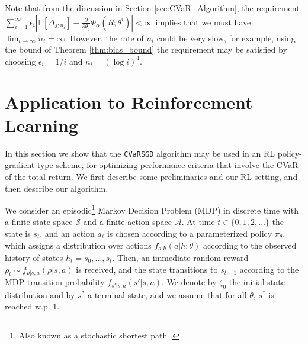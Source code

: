 \documentclass[letterpaper]{article}
\newcommand{\E}{\mathbb{E}}
\newcommand{\cvar}{\Phi_\alpha}
\newcommand{\cS}{\mathcal{S}}
\newcommand{\cA}{\mathcal{A}}
\newcommand{\Dth}{\frac{\partial}{\partial \theta_j}}
\begin{document}
Note that from the discussion in Section \ref{sec:CVaR_Algorithm}, the requirement $\sum_{i=1}^\infty \epsilon_i \left| \E \left[ \Delta_{j;n_i} \right] - \Dth\cvar (R;\theta^i)\right|< \infty$ implies that we must have $\lim_{i \to \infty} n_i = \infty$. However, the rate of $n_i$ could be very slow, for example, using the bound of Theorem \ref{thm:bias_bound} the requirement may be satisfied by choosing $\epsilon_i = 1/i$ and $n_i = (\log i)^4$.


\section{Application to Reinforcement Learning}\label{sec:RL}

In this section we show that the \texttt{CVaRSGD} algorithm may be used in an RL policy-gradient type scheme, for optimizing performance criteria that involve the CVaR of the total return. We first describe some preliminaries and our RL setting, and then describe our algorithm.

We consider an episodic\footnote{Also known as a stochastic shortest path \cite{Ber2012DynamicProgramming}.} Markov Decision Problem (MDP) in discrete time with a finite state space $\cS$ and a finite action space $\cA$.
At time $t \in \{0,1,2,\dots\}$ the state is $s_t$, and an action $a_t$ is chosen according to a parameterized policy $\pi_\theta$, which assigns a distribution over actions $f_{a|h}(a|h;\theta)$ according to the observed history of states $h_t = s_0,\dots,s_t$. Then, an immediate random reward $\rho_t \sim f_{\rho|s,a} (\rho|s,a)$ is received,
and the state transitions to $s_{t+1}$ according to the MDP transition probability $f_{s'|s,a}(s'|s,a)$. We denote by $\zeta_0$ the initial state distribution and by $s^*$ a terminal state, and we assume that for all $\theta$, $s^*$ is reached w.p. 1.
\end{document}
